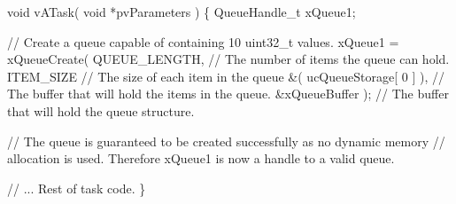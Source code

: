 \begin{DoxyPre}  void vATask( void *pvParameters )
  \{
  QueueHandle\_t xQueue1;\end{DoxyPre}



\begin{DoxyPre}   // Create a queue capable of containing 10 uint32\_t values.
   xQueue1 = xQueueCreate( QUEUE\_LENGTH, // The number of items the queue can hold.
                           ITEM\_SIZE     // The size of each item in the queue
                           \&( ucQueueStorage[ 0 ] ), // The buffer that will hold the items in the queue.
                           \&xQueueBuffer ); // The buffer that will hold the queue structure.\end{DoxyPre}



\begin{DoxyPre}   // The queue is guaranteed to be created successfully as no dynamic memory
   // allocation is used.  Therefore xQueue1 is now a handle to a valid queue.\end{DoxyPre}



\begin{DoxyPre}   // ... Rest of task code.
  \}
  \end{DoxyPre}
 